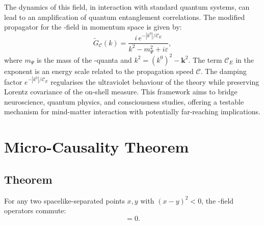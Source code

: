\documentclass[11pt,a4paper]{article}
\newcommand{\PsiField}{\ensuremath{\Psi}}
\newcommand{\PropSpeed}{\ensuremath{\mathscr{C}}}
\begin{document}
The dynamics of this field, in interaction with standard quantum systems, can lead to an amplification of quantum entanglement correlations. The modified propagator for the \PsiFieldField-field in momentum space is given by:
\begin{equation}
    \tilde G_{\PropSpeed}(k) = \frac{i\,e^{-|k^0|/\PropSpeed_{E}}}{k^{2}-m_\PsiField^{2}+i\varepsilon},
\end{equation}
where $m_\PsiField$ is the mass of the \PsiFieldField-quanta and $k^2 = (k^0)^2 - \mathbf{k}^2$. The term $\PropSpeed_{E}$ in the exponent is an energy scale related to the propagation speed $\PropSpeed$. The damping factor $e^{-|k^{0}|/\PropSpeed_{E}}$ regularises the ultraviolet behaviour of the theory while preserving Lorentz covariance of the on-shell measure. This framework aims to bridge neuroscience, quantum physics, and consciousness studies, offering a testable mechanism for mind-matter interaction with potentially far-reaching implications.

\section{Micro-Causality Theorem}
\label{sec:micro-causality-theorem}
\subsection*{Theorem}
For any two spacelike-separated points $x,y$ with $(x-y)^{2}<0$, the \PsiFieldField-field operators commute:
\begin{equation}
    [\PsiField(x),\PsiField(y)] = 0.
\end{equation}
\end{document}
